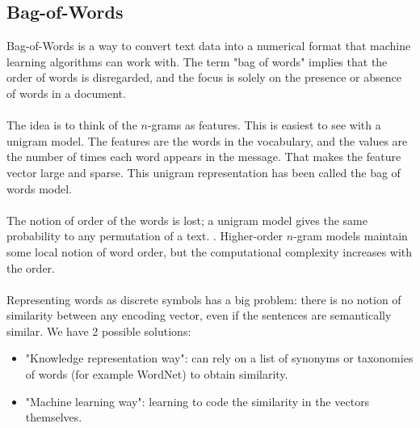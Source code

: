 \subsection{Bag-of-Words}
Bag-of-Words is a way to convert text data into a numerical format that machine learning algorithms can work with. The term "bag of words" implies that the order of words is disregarded, and the focus is solely on the presence or absence of words in a document.\\\\
The idea is to think of the $n$-grams as features. This is easiest to see with a unigram model. The features are the words in the vocabulary, and the values are the number of times each word appears in the message. That makes the feature vector large and sparse. This unigram representation has been called the bag of words model.
\\\\
The notion of order of the words is lost; a unigram model gives the same probability to any permutation of a text. . Higher-order $n$-gram models maintain some local notion of word order, but the computational complexity increases with the order.\\\\
Representing words as discrete symbols has a big problem: there is no notion of similarity between any encoding vector, even if the sentences are semantically similar. We have 2 possible solutions:
\begin{itemize}
    \item "Knowledge representation way": can rely on a list of synonyms or taxonomies of words (for example WordNet) to obtain similarity.

    \item "Machine learning way": learning to code the similarity in the vectors themselves.
\end{itemize}

